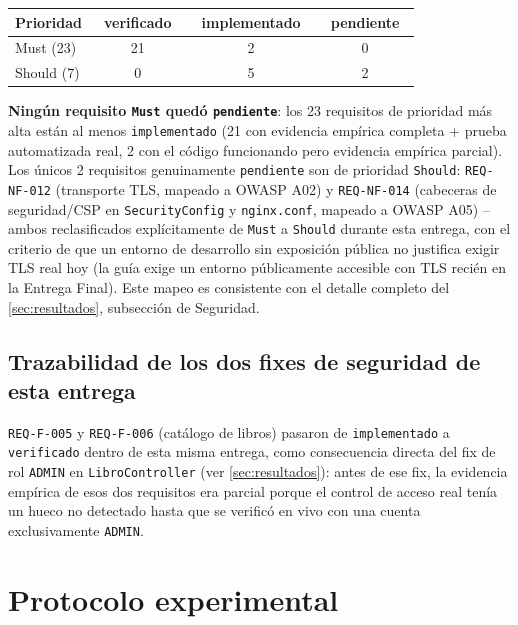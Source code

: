 \documentclass[12pt,a4paper]{article}
\newcommand{\estadoVerificado}{\colorbox{verdelight}{\color{white}\small\bfseries\ verificado\ }}
\newcommand{\estadoImplementado}{\colorbox{sqlcolor}{\color{white}\small\bfseries\ implementado\ }}
\newcommand{\estadoPend}{\colorbox{gapcolor}{\color{white}\small\bfseries\ pendiente\ }}
\begin{document}
\begin{center}
\begin{tabular}{|l|c|c|c|}
\hline
\rowcolor{verdeuteq}
\color{white}\textbf{Prioridad} & \color{white}\estadoVerificado & \color{white}\estadoImplementado & \color{white}\estadoPend \\
\hline
Must (23) & 21 & 2 & 0 \\
Should (7) & 0 & 5 & 2 \\
\hline
\end{tabular}
\end{center}

\textbf{Ningún requisito \texttt{Must} quedó \texttt{pendiente}}: los 23
requisitos de prioridad más alta están al menos \texttt{implementado}
(21 con evidencia empírica completa + prueba automatizada real, 2 con el
código funcionando pero evidencia empírica parcial). Los únicos 2
requisitos genuinamente \texttt{pendiente} son de prioridad
\texttt{Should}: \texttt{REQ-NF-012} (transporte TLS, mapeado a OWASP
A02) y \texttt{REQ-NF-014} (cabeceras de seguridad/CSP en
\texttt{SecurityConfig} y \texttt{nginx.conf}, mapeado a OWASP A05) --
ambos reclasificados explícitamente de \texttt{Must} a \texttt{Should}
durante esta entrega, con el criterio de que un entorno de desarrollo
sin exposición pública no justifica exigir TLS real hoy (la guía exige
un entorno públicamente accesible con TLS recién en la Entrega Final).
Este mapeo es consistente con el detalle completo del
\autoref{sec:resultados}, subsección de Seguridad.

\subsection{Trazabilidad de los dos fixes de seguridad de esta entrega}

\texttt{REQ-F-005} y \texttt{REQ-F-006} (catálogo de libros) pasaron de
\texttt{implementado} a \texttt{verificado} dentro de esta misma entrega,
como consecuencia directa del fix de rol \texttt{ADMIN} en
\texttt{LibroController} (ver \autoref{sec:resultados}): antes de ese
fix, la evidencia empírica de esos dos requisitos era parcial porque el
control de acceso real tenía un hueco no detectado hasta que se verificó
en vivo con una cuenta exclusivamente \texttt{ADMIN}.

\section{Protocolo experimental}
\label{sec:protocolo}
\end{document}
